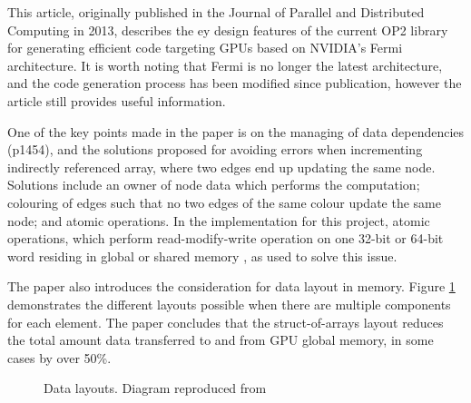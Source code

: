 This article, originally published in the Journal of Parallel and Distributed Computing in 2013, describes the ey design features of the current OP2 library for generating efficient code targeting GPUs based on NVIDIA’s Fermi architecture. It is worth noting that Fermi is no longer the latest architecture, and the code generation process has been modified since publication, however the article still provides useful information.
\par
One of the key points made in the paper is on the managing of data dependencies (p1454), and the solutions proposed for avoiding errors when incrementing indirectly referenced array, where two edges end up updating the same node. Solutions include an owner of node data which performs the computation; colouring of edges such that no two edges of the same colour update the same node; and atomic operations. In the implementation for this project, atomic operations, which perform read-modify-write operation on one 32-bit or 64-bit word residing in global or shared memory \cite[p96]{guide}, as used to solve this issue.
\par
The paper also introduces the consideration for data layout in memory. Figure \ref{fig:soa_v_aos} demonstrates the different layouts possible when there are multiple components for each element. The paper concludes that the struct-of-arrays layout reduces the total amount data transferred to and from GPU global memory, in some cases by over 50\%.

\begin{figure}[h]
  \centering

  \quad

  \caption{\label{fig:soa_v_aos} Data layouts. Diagram reproduced from \cite{gpudesign}}
\end{figure}

